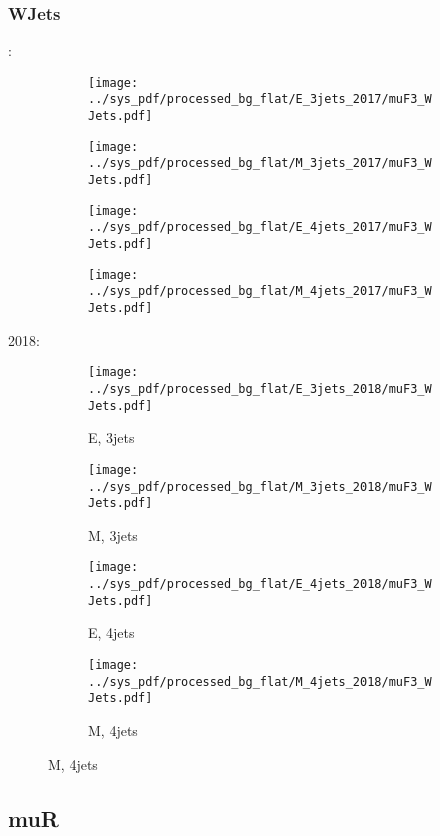 \documentclass{beamer}
\begin{document}
\begin{frame}
\frametitle{WJets}
\fontsize{5}{1}:
\begin{figure}
\centering
\begin{subfigure}[b]{0.24\textwidth}
\texttt{[image: ../sys\_pdf/processed\_bg\_flat/E\_3jets\_2017/muF3\_WJets.pdf]}
\end{subfigure}
\begin{subfigure}[b]{0.24\textwidth}
\texttt{[image: ../sys\_pdf/processed\_bg\_flat/M\_3jets\_2017/muF3\_WJets.pdf]}
\end{subfigure}
\begin{subfigure}[b]{0.24\textwidth}
\texttt{[image: ../sys\_pdf/processed\_bg\_flat/E\_4jets\_2017/muF3\_WJets.pdf]}
\end{subfigure}
\begin{subfigure}[b]{0.24\textwidth}
\texttt{[image: ../sys\_pdf/processed\_bg\_flat/M\_4jets\_2017/muF3\_WJets.pdf]}
\end{subfigure}
\end{figure}
2018:
\begin{figure}
\centering
\begin{subfigure}[b]{0.24\textwidth}
\texttt{[image: ../sys\_pdf/processed\_bg\_flat/E\_3jets\_2018/muF3\_WJets.pdf]}
\captionsetup{font=tiny}
\caption{E, 3jets}
\end{subfigure}
\begin{subfigure}[b]{0.24\textwidth}
\texttt{[image: ../sys\_pdf/processed\_bg\_flat/M\_3jets\_2018/muF3\_WJets.pdf]}
\captionsetup{font=tiny}
\caption{M, 3jets}
\end{subfigure}
\begin{subfigure}[b]{0.24\textwidth}
\texttt{[image: ../sys\_pdf/processed\_bg\_flat/E\_4jets\_2018/muF3\_WJets.pdf]}
\captionsetup{font=tiny}
\caption{E, 4jets}
\end{subfigure}
\begin{subfigure}[b]{0.24\textwidth}
\texttt{[image: ../sys\_pdf/processed\_bg\_flat/M\_4jets\_2018/muF3\_WJets.pdf]}
\captionsetup{font=tiny}
\caption{M, 4jets}
\end{subfigure}
\end{figure}
\end{frame}


\subsection{muR}
\end{document}
